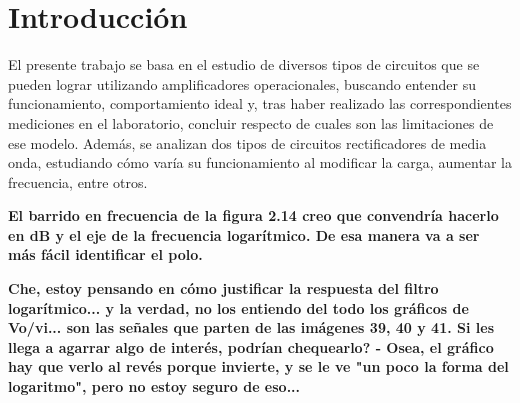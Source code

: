 \section{Introducción}
\label{sec:intro}


El presente trabajo se basa en el estudio de diversos tipos de circuitos que se pueden lograr utilizando amplificadores operacionales, buscando entender su funcionamiento, comportamiento ideal y, tras haber realizado las correspondientes mediciones en el laboratorio, concluir respecto de cuales son las limitaciones de ese modelo. Además, se analizan dos tipos de circuitos rectificadores de media onda, estudiando cómo varía su funcionamiento al modificar la carga, aumentar la frecuencia, entre otros.

{\bf El barrido en frecuencia de la figura 2.14 creo que convendría hacerlo en dB y el eje de la frecuencia logarítmico. De esa manera va a ser más fácil identificar el polo.}


{\bf Che, estoy pensando en cómo justificar la respuesta del filtro logarítmico... y la verdad, no los entiendo del todo los gráficos de Vo/vi... son las señales que parten de las imágenes 39, 40 y 41. Si les llega a agarrar algo de interés, podrían chequearlo? - Osea, el gráfico hay que verlo al revés porque invierte, y se le ve "un poco la forma del logaritmo", pero no estoy seguro de eso...}




